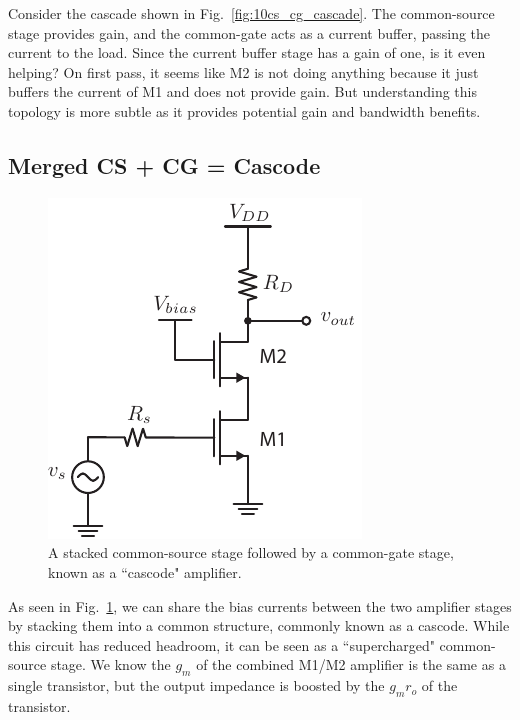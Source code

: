 Consider the cascade shown in Fig.~\ref{fig:10cs_cg_cascade}.  The common-source stage provides gain, and the common-gate acts as a current buffer, passing the current to the load.  Since the current buffer stage has a gain of one, is it even helping?  On first pass, it seems like M2 is not doing anything because it just buffers the current of M1 and does not provide gain.  But understanding this topology is more subtle as it provides potential gain and bandwidth benefits.
\subsection{Merged CS + CG = Cascode}
\begin{figure}[tb]
\begin{center}
\includegraphics[scale=1]{10cascode_dc}
\end{center}
\caption{A stacked common-source stage followed by a common-gate stage, known as a ``cascode" amplifier.}
\label{fig:10cascode_dc}
\end{figure}

As seen in Fig.~\ref{fig:10cascode_dc}, we can share the bias currents between the two amplifier stages by stacking them into a common structure, commonly known as a cascode.  While this circuit has reduced headroom, it can be seen as a ``supercharged" common-source stage.  We know the $g_m$ of the combined M1/M2 amplifier is the same as a single transistor, but the output impedance is boosted by the $g_m r_o$ of the transistor.
